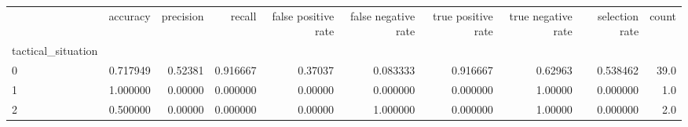 \begin{tabular}{lrrrrrrrrr}
\toprule
{} &  accuracy &  precision &    recall &  false positive rate &  false negative rate &  true positive rate &  true negative rate &  selection rate &  count \\
tactical\_situation &           &            &           &                      &                      &                     &                     &                 &        \\
\midrule
0                  &  0.717949 &    0.52381 &  0.916667 &              0.37037 &             0.083333 &            0.916667 &             0.62963 &        0.538462 &   39.0 \\
1                  &  1.000000 &    0.00000 &  0.000000 &              0.00000 &             0.000000 &            0.000000 &             1.00000 &        0.000000 &    1.0 \\
2                  &  0.500000 &    0.00000 &  0.000000 &              0.00000 &             1.000000 &            0.000000 &             1.00000 &        0.000000 &    2.0 \\
\bottomrule
\end{tabular}
